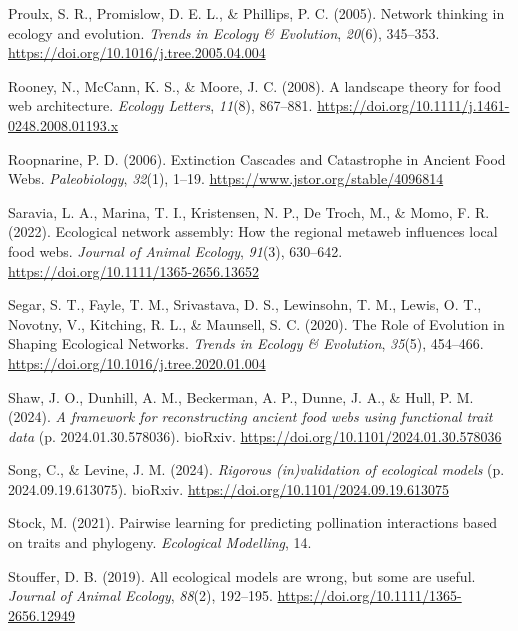\documentclass[
]{article}
\newlength{\cslhangindent}
\newenvironment{CSLReferences}[2] %
 {\begin{list}{}{%
  \setlength{\itemindent}{0pt}
  \setlength{\leftmargin}{0pt}
  \setlength{\parsep}{0pt}
  \ifodd #1
   \setlength{\leftmargin}{\cslhangindent}
   \setlength{\itemindent}{-1\cslhangindent}
  \fi
  \setlength{\itemsep}{#2\baselineskip}}}
 {\end{list}}
\begin{document}
\begin{CSLReferences}{1}{0}
Proulx, S. R., Promislow, D. E. L., \& Phillips, P. C. (2005). Network
thinking in ecology and evolution. \emph{Trends in Ecology \&
Evolution}, \emph{20}(6), 345--353.
\url{https://doi.org/10.1016/j.tree.2005.04.004}

Rooney, N., McCann, K. S., \& Moore, J. C. (2008). A landscape theory
for food web architecture. \emph{Ecology Letters}, \emph{11}(8),
867--881. \url{https://doi.org/10.1111/j.1461-0248.2008.01193.x}

Roopnarine, P. D. (2006). Extinction {Cascades} and {Catastrophe} in
{Ancient Food Webs}. \emph{Paleobiology}, \emph{32}(1), 1--19.
\url{https://www.jstor.org/stable/4096814}

Saravia, L. A., Marina, T. I., Kristensen, N. P., De Troch, M., \& Momo,
F. R. (2022). Ecological network assembly: {How} the regional metaweb
influences local food webs. \emph{Journal of Animal Ecology},
\emph{91}(3), 630--642. \url{https://doi.org/10.1111/1365-2656.13652}

Segar, S. T., Fayle, T. M., Srivastava, D. S., Lewinsohn, T. M., Lewis,
O. T., Novotny, V., Kitching, R. L., \& Maunsell, S. C. (2020). The
{Role} of {Evolution} in {Shaping Ecological Networks}. \emph{Trends in
Ecology \& Evolution}, \emph{35}(5), 454--466.
\url{https://doi.org/10.1016/j.tree.2020.01.004}

Shaw, J. O., Dunhill, A. M., Beckerman, A. P., Dunne, J. A., \& Hull, P.
M. (2024). \emph{A framework for reconstructing ancient food webs using
functional trait data} (p. 2024.01.30.578036). bioRxiv.
\url{https://doi.org/10.1101/2024.01.30.578036}

Song, C., \& Levine, J. M. (2024). \emph{Rigorous (in)validation of
ecological models} (p. 2024.09.19.613075). bioRxiv.
\url{https://doi.org/10.1101/2024.09.19.613075}

Stock, M. (2021). Pairwise learning for predicting pollination
interactions based on traits and phylogeny. \emph{Ecological Modelling},
14.

Stouffer, D. B. (2019). All ecological models are wrong, but some are
useful. \emph{Journal of Animal Ecology}, \emph{88}(2), 192--195.
\url{https://doi.org/10.1111/1365-2656.12949}


\end{CSLReferences}
\end{document}
